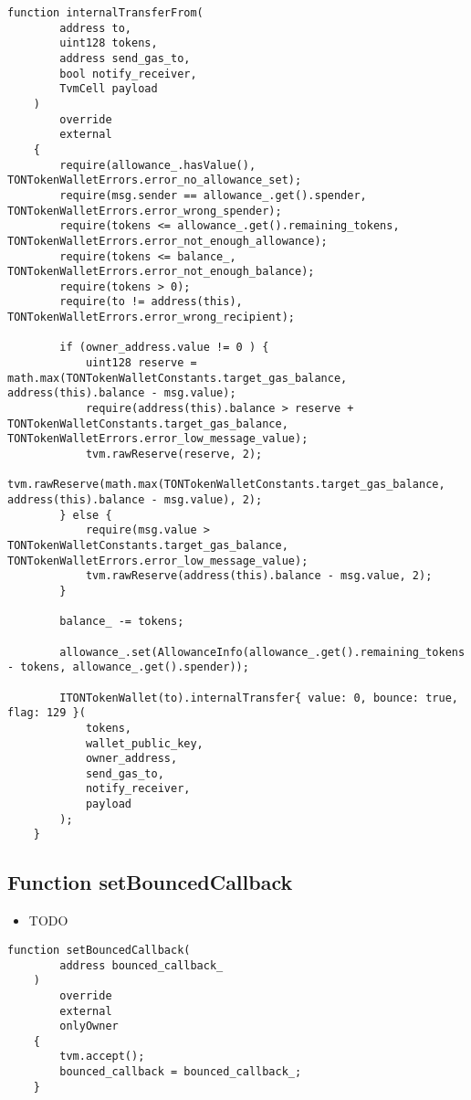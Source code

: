 \begin{lstlisting}[firstnumber=423]
    function internalTransferFrom(
        address to,
        uint128 tokens,
        address send_gas_to,
        bool notify_receiver,
        TvmCell payload
    )
        override
        external
    {
        require(allowance_.hasValue(), TONTokenWalletErrors.error_no_allowance_set);
        require(msg.sender == allowance_.get().spender, TONTokenWalletErrors.error_wrong_spender);
        require(tokens <= allowance_.get().remaining_tokens, TONTokenWalletErrors.error_not_enough_allowance);
        require(tokens <= balance_, TONTokenWalletErrors.error_not_enough_balance);
        require(tokens > 0);
        require(to != address(this), TONTokenWalletErrors.error_wrong_recipient);

        if (owner_address.value != 0 ) {
            uint128 reserve = math.max(TONTokenWalletConstants.target_gas_balance, address(this).balance - msg.value);
            require(address(this).balance > reserve + TONTokenWalletConstants.target_gas_balance, TONTokenWalletErrors.error_low_message_value);
            tvm.rawReserve(reserve, 2);
            tvm.rawReserve(math.max(TONTokenWalletConstants.target_gas_balance, address(this).balance - msg.value), 2);
        } else {
            require(msg.value > TONTokenWalletConstants.target_gas_balance, TONTokenWalletErrors.error_low_message_value);
            tvm.rawReserve(address(this).balance - msg.value, 2);
        }

        balance_ -= tokens;

        allowance_.set(AllowanceInfo(allowance_.get().remaining_tokens - tokens, allowance_.get().spender));

        ITONTokenWallet(to).internalTransfer{ value: 0, bounce: true, flag: 129 }(
            tokens,
            wallet_public_key,
            owner_address,
            send_gas_to,
            notify_receiver,
            payload
        );
    }
\end{lstlisting}

\subsection{Function setBouncedCallback}

\noindent\begin{itemize}
\item TODO
\end{itemize}

\begin{lstlisting}[firstnumber=568]
    function setBouncedCallback(
        address bounced_callback_
    )
        override
        external
        onlyOwner
    {
        tvm.accept();
        bounced_callback = bounced_callback_;
    }
\end{lstlisting}

